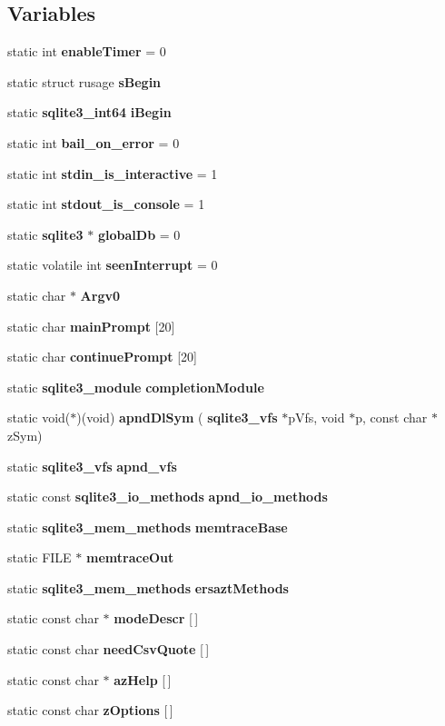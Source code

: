 \subsection*{Variables}
\begin{DoxyCompactItemize}
\item 
static int \textbf{ enable\+Timer} = 0
\item 
static struct rusage \textbf{ s\+Begin}
\item 
static \textbf{ sqlite3\+\_\+int64} \textbf{ i\+Begin}
\item 
static int \textbf{ bail\+\_\+on\+\_\+error} = 0
\item 
static int \textbf{ stdin\+\_\+is\+\_\+interactive} = 1
\item 
static int \textbf{ stdout\+\_\+is\+\_\+console} = 1
\item 
static \textbf{ sqlite3} $\ast$ \textbf{ global\+Db} = 0
\item 
static volatile int \textbf{ seen\+Interrupt} = 0
\item 
static char $\ast$ \textbf{ Argv0}
\item 
static char \textbf{ main\+Prompt} [20]
\item 
static char \textbf{ continue\+Prompt} [20]
\item 
static \textbf{ sqlite3\+\_\+module} \textbf{ completion\+Module}
\item 
static void($\ast$)(void) \textbf{ apnd\+Dl\+Sym} (\textbf{ sqlite3\+\_\+vfs} $\ast$p\+Vfs, void $\ast$p, const char $\ast$z\+Sym)
\item 
static \textbf{ sqlite3\+\_\+vfs} \textbf{ apnd\+\_\+vfs}
\item 
static const \textbf{ sqlite3\+\_\+io\+\_\+methods} \textbf{ apnd\+\_\+io\+\_\+methods}
\item 
static \textbf{ sqlite3\+\_\+mem\+\_\+methods} \textbf{ memtrace\+Base}
\item 
static F\+I\+LE $\ast$ \textbf{ memtrace\+Out}
\item 
static \textbf{ sqlite3\+\_\+mem\+\_\+methods} \textbf{ ersazt\+Methods}
\item 
static const char $\ast$ \textbf{ mode\+Descr} [$\,$]
\item 
static const char \textbf{ need\+Csv\+Quote} [$\,$]
\item 
static const char $\ast$ \textbf{ az\+Help} [$\,$]
\item 
static const char \textbf{ z\+Options} [$\,$]
\end{DoxyCompactItemize}


